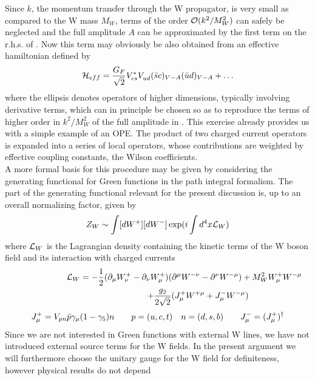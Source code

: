 Since $k$, the momentum transfer through the W propagator, is very
small as compared to the W mass $M_W$, terms of the order
${\cal O}(k^2/M^2_W)$ can safely be neg\-lected and the full amplitude $A$
can be approximated by the first term on the r.h.s. of .
Now this term may obviously be also obtained from an effective
hamiltonian defined by
\begin{equation}\label{hc0}
{\cal H}_{eff}={G_F\over\sqrt{2}}V^*_{cs}V_{ud}^{}
  (\bar sc)_{V-A}(\bar ud)_{V-A} + \ldots  \end{equation}
where the ellipsis denotes operators of higher dimensions, typically
involving derivative terms, which can in principle be chosen so
as to reproduce the terms of higher order in $k^2/M^2_W$ of the
full amplitude in . This exercise already provides us with
a simple example of an OPE. The product of two charged current
operators is expanded into a series of local operators,
whose contributions are weighted by effective coupling constants,
the Wilson coefficients.\\
A more formal basis for this procedure may be given by considering
the genera\-ting functional for Green functions in the path integral
formalism. The part of the generating functional relevant for the
present discussion is, up to an overall normalizing factor, given by
\begin{equation}\label{zw1}
Z_W\sim\int [dW^+][dW^-] \exp(i\int d^4x {\cal L}_W)  \end{equation}
where ${\cal L}_W$ is the Lagrangian density containing the kinetic
terms of the W boson field and its interaction with charged currents
\begin{eqnarray}\label{lwjw}
\lefteqn{{\cal L}_W=
-{1\over 2}(\partial_\mu W^+_\nu-\partial_\nu W^+_\mu)
 (\partial^\mu W^{-\nu}-\partial^\nu W^{-\mu})+M^2_W W^+_\mu W^{-\mu}}
\hspace{3cm} \nonumber\\
& & +{g_2\over 2\sqrt{2}}(J^+_\mu W^{+\mu}+J^-_\mu W^{-\mu})
\end{eqnarray}
\begin{equation}\label{jpn}
J^+_\mu=V_{pn} \bar p\gamma_\mu(1-\gamma_5)n\qquad p=(u, c, t)
\quad n=(d, s, b)\qquad J^-_\mu=(J^+_\mu)^\dagger  \end{equation}
Since we are not interested in Green functions with external W lines,
we have not introduced external source terms for the W fields. In the
present argument we will furthermore choose the unitary gauge for
the W field for definiteness, however physical results do not depend
